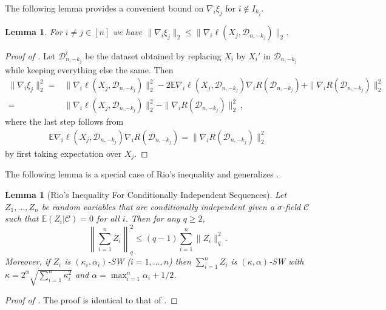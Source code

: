 \documentclass[11pt]{article}
\theoremstyle{plain}
\newtheorem{lemma}[theorem]{Lemma}
\newcommand{\D}{{\mathcal{D}}}
\begin{document}
The following lemma provides a convenient bound on $\nabla_i\xi_j$ for $i\notin I_{k_j}$.
\begin{lemma}\label{lem:4.4-nabla-xi}
    For $i\neq j\in [n]$ we have
    $\|\nabla_i\xi_j\|_2\le \|\nabla_i\ell(X_j,\D_{n,-k_j})\|_2$.
\end{lemma}
\begin{proof}
    [Proof of ]
    Let $\D_{n,-k_j}^i$ be the dataset obtained by replacing $X_i$ by $X_i'$ in $\D_{n,-k_j}$ while keeping everything else the same.
    Then
    \begin{align*}
        \|\nabla_i\xi_j\|_2^2=& \|\nabla_i \ell(X_j,\D_{n,-k_j})\|_2^2-2\mathbb E \nabla_i\ell(X_j,\D_{n,-k_j})\nabla_i R(\D_{n,-k_j})+\|\nabla_i R(\D_{n,-k_j})\|_2^2\\
        =&\|\nabla_i \ell(X_j,\D_{n,-k_j})\|_2^2-\|\nabla_i R(\D_{n,-k_j})\|_2^2\,,
    \end{align*}
    where the last step follows from
    \begin{align*}
        \mathbb E \nabla_i\ell(X_j,\D_{n,-k_j})\nabla_i R(\D_{n,-k_j}) = \|\nabla_i R(\D_{n,-k_j})\|_2^2
    \end{align*}
    by first taking expectation over $X_j$.
\end{proof}

The following lemma is a special case of Rio's inequality  and generalizes .
\begin{lemma}[Rio's Inequality For Conditionally Independent Sequences]\label{lem:4.4-rio_cond_i.i.d.}
    Let $Z_1,...,Z_n$ be random variables that are conditionally independent given a $\sigma$-field $\mathcal C$ such that $\mathbb E(Z_i|\mathcal C)=0$ for all $i$. Then for any $q\ge 2$,
    $$
    \left\|\sum_{i=1}^n Z_i\right\|_q^2\le (q-1)\sum_{i=1}^n \|Z_i\|_q^2\,.
    $$
    Moreover, if $Z_i$ is $(\kappa_i,\alpha_i)$-SW ($i=1,...,n$) then
    $\sum_{i=1}^n Z_i$ is $(\kappa,\alpha)$-SW with
    $\kappa=2^\alpha\sqrt{\sum_{i=1}^n\kappa_i^2}$ and $\alpha=\max_{i=1}^n\alpha_i+1/2$.
\end{lemma}
\begin{proof}
   [Proof of ]
The proof is identical to that of . 
\end{proof}
\end{document}
